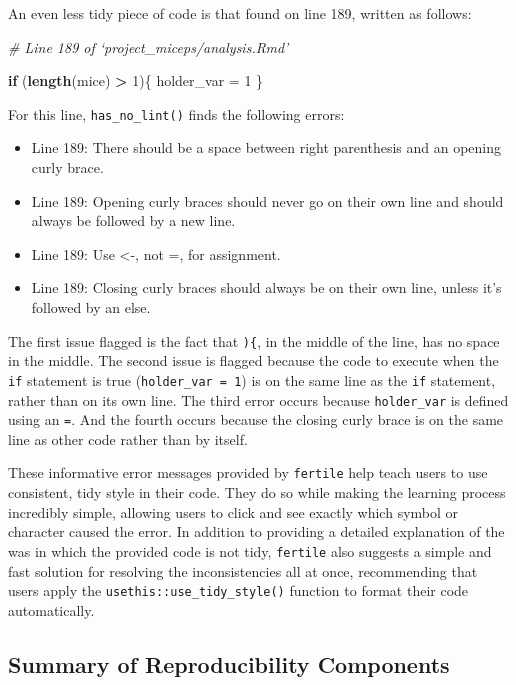\documentclass[12pt,twoside]{reedthesis}
\newenvironment{Shaded}{\begin{snugshade}}{\end{snugshade}}
\newcommand{\KeywordTok}[1]{\textcolor[rgb]{0.13,0.29,0.53}{\textbf{#1}}}
\newcommand{\DecValTok}[1]{\textcolor[rgb]{0.00,0.00,0.81}{#1}}
\newcommand{\StringTok}[1]{\textcolor[rgb]{0.31,0.60,0.02}{#1}}
\newcommand{\CommentTok}[1]{\textcolor[rgb]{0.56,0.35,0.01}{\textit{#1}}}
\newcommand{\ControlFlowTok}[1]{\textcolor[rgb]{0.13,0.29,0.53}{\textbf{#1}}}
\newcommand{\OperatorTok}[1]{\textcolor[rgb]{0.81,0.36,0.00}{\textbf{#1}}}
\newcommand{\NormalTok}[1]{#1}
\begin{document}
An even less tidy piece of code is that found on line 189, written as
follows:
\begin{Shaded}
\begin{Highlighting}[]
\CommentTok{# Line 189 of `project_miceps/analysis.Rmd'}

\ControlFlowTok{if}\NormalTok{ (}\KeywordTok{length}\NormalTok{(mice) }\OperatorTok{>}\StringTok{ }\DecValTok{1}\NormalTok{)\{ holder_var =}\StringTok{ }\DecValTok{1}\NormalTok{ \}}
\end{Highlighting}
\end{Shaded}
For this line, \texttt{has\_no\_lint()} finds the following errors:
\begin{itemize}
\item
  Line 189: There should be a space between right parenthesis and an
  opening curly brace.
\item
  Line 189: Opening curly braces should never go on their own line and
  should always be followed by a new line.
\item
  Line 189: Use \textless{}-, not =, for assignment.
\item
  Line 189: Closing curly braces should always be on their own line,
  unless it's followed by an else.
\end{itemize}
The first issue flagged is the fact that \texttt{)\{}, in the middle of
the line, has no space in the middle. The second issue is flagged
because the code to execute when the \texttt{if} statement is true
(\texttt{holder\_var\ =\ 1}) is on the same line as the \texttt{if}
statement, rather than on its own line. The third error occurs because
\texttt{holder\_var} is defined using an \texttt{=}. And the fourth
occurs because the closing curly brace is on the same line as other code
rather than by itself.

These informative error messages provided by \texttt{fertile} help teach
users to use consistent, tidy style in their code. They do so while
making the learning process incredibly simple, allowing users to click
and see exactly which symbol or character caused the error. In addition
to providing a detailed explanation of the was in which the provided
code is not tidy, \texttt{fertile} also suggests a simple and fast
solution for resolving the inconsistencies all at once, recommending
that users apply the \texttt{usethis::use\_tidy\_style()} function to
format their code automatically.

\subsection{Summary of Reproducibility
Components}\label{summary-of-reproducibility-components}
\end{document}
